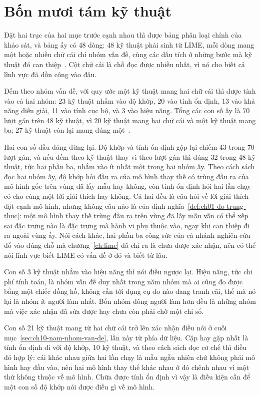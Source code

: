 \section{Bốn mươi tám kỹ thuật}
\label{sec:ch10-vuon-bien-the}

%
Đặt hai trục của hai mục trước cạnh nhau thì được bảng phân loại chính của khảo
sát, và bảng ấy có 48 dòng: 48 kỹ thuật phái sinh từ LIME, mỗi dòng mang một
hoặc nhiều chữ cái chỉ nhóm vấn đề, cùng các dấu tích ở những bước mà kỹ thuật
đó can thiệp~\autocite{p22whichlime}. Cột chữ cái là chỗ đọc được nhiều nhất, vì
nó cho biết cả lĩnh vực đã dồn công vào đâu.

Đếm theo nhóm vấn đề, với quy ước một kỹ thuật mang hai chữ cái thì được tính
vào cả hai nhóm: 23 kỹ thuật nhắm vào độ khớp, 20 vào tính ổn định, 13 vào khả
năng diễn giải, 11 vào tính cục bộ, và 3 vào hiệu năng. Tổng các con số ấy là 70
lượt gán trên 48 kỹ thuật, vì 20 kỹ thuật mang hai chữ cái và một kỹ thuật mang
ba; 27 kỹ thuật còn lại mang đúng một~\autocite{p22whichlime}.

Hai con số đầu đáng dừng lại. Độ khớp và tính ổn định gộp lại chiếm 43 trong 70
lượt gán, và nếu đếm theo kỹ thuật thay vì theo lượt gán thì đúng 32 trong 48 kỹ
thuật, tức hai phần ba, nhắm vào ít nhất một trong hai nhóm ấy. Theo cách sách
đọc hai nhóm ấy, độ khớp hỏi đầu ra của mô hình thay thế có trùng đầu ra của mô
hình gốc trên vùng đã lấy mẫu hay không, còn tính ổn định hỏi hai lần chạy có
cho cùng một lời giải thích hay không. Cả hai đều là câu hỏi về lời giải thích
đặt cạnh mô hình, nhưng không câu nào là  của
định nghĩa~\ref{def:ch01-do-trung-thuc}: một mô hình thay thế trùng đầu ra trên
vùng đã lấy mẫu vẫn có thể xếp sai đặc trưng nào là đặc trưng mà hành vi phụ
thuộc vào, ngay khi can thiệp đi ra ngoài vùng ấy.
Nói cách khác, hai phần ba công sức của cả nhánh nghiên cứu đổ vào đúng chỗ mà
chương~\ref{ch:lime} đã chỉ ra là chưa được xác nhận, nên có thể nói lĩnh vực
biết LIME có vấn đề ở đó và biết từ lâu.

Con số 3 kỹ thuật nhắm vào hiệu năng thì nói điều ngược lại. Hiệu năng, tức chi
phí tính toán, là nhóm vấn đề duy nhất trong năm nhóm mà ai cũng đo được bằng một chiếc đồng
hồ, không cần tới dụng cụ đo nào đang tranh cãi, thế mà nó lại là nhóm ít người
làm nhất. Bốn nhóm đông người làm hơn đều là những nhóm mà việc xác nhận đã sửa
được hay chưa còn phải chờ một chỉ số.

%
Con số 21 kỹ thuật mang từ hai chữ cái trở lên xác nhận điều nói ở cuối
mục~\ref{sec:ch10-nam-nhom-van-de}, lần này từ phía dữ liệu. Cặp hay gặp nhất là tính ổn
định đi với độ khớp, 10 kỹ thuật, và theo cách sách đọc cơ chế thì điều đó hợp
lý: cái khác nhau giữa hai lần chạy là mẫu ngẫu nhiên chứ không phải mô hình hay
đầu vào, nên hai mô hình thay thế khác nhau ở đó chênh nhau vì một thứ không
thuộc về mô hình. Chữa được tính ổn định vì vậy là điều kiện cần để một con số
độ khớp nói được điều gì về mô hình.

